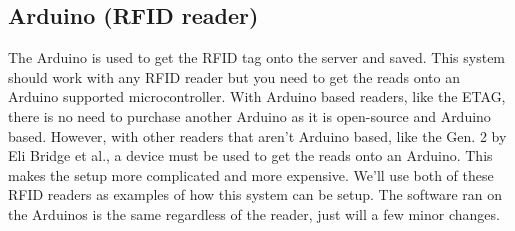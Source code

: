 \documentclass[12pt]{article}
\begin{document}
\subsection{Arduino (RFID reader)}
The Arduino is used to get the RFID tag onto the server and saved.  This system should work with any RFID reader but you need to get the reads onto an Arduino supported microcontroller.  With Arduino based readers, like the ETAG, there is no need to purchase another Arduino as it is open-source and Arduino based.  However, with other readers that aren't Arduino based, like the Gen. 2 by Eli Bridge et al., a device must be used to get the reads onto an Arduino.  This makes the setup more complicated and more expensive.  We'll use both of these RFID readers as examples of how this system can be setup.  The software ran on the Arduinos is the same regardless of the reader, just will a few minor changes.
\end{document}
